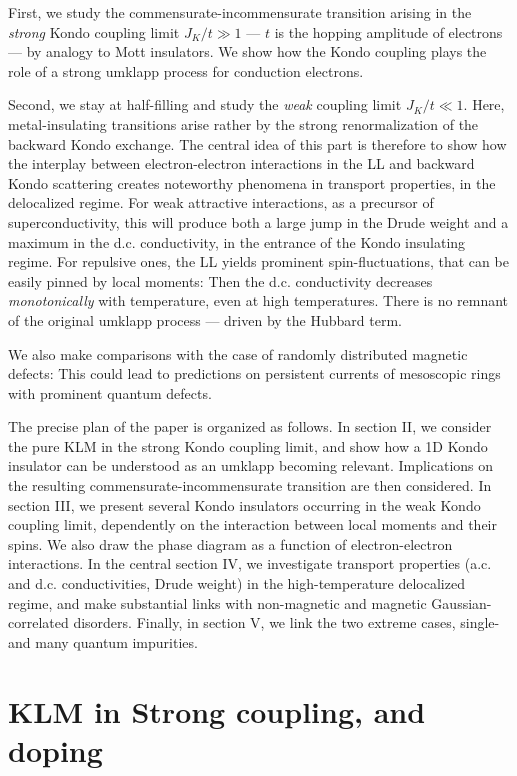 First, we study the commensurate-incommensurate 
transition arising in the {\it strong} Kondo coupling limit 
$J_K/t\gg 1$ --- $t$ is the hopping amplitude of electrons --- by 
analogy to Mott insulators. We show how the Kondo coupling plays the role of
a strong umklapp process for conduction electrons.

Second, we stay at half-filling and study the {\it weak} coupling limit
$J_K/t\ll 1$. 
Here,
metal-insulating transitions\cite{Giam1} arise rather
by the strong renormalization of the backward Kondo
exchange. The central idea of this part is therefore to show how
the interplay between electron-electron interactions in the LL 
and backward Kondo
scattering creates noteworthy phenomena in transport properties, in the
delocalized regime. 
For weak attractive interactions, as a precursor of 
superconductivity, 
this will produce both a large jump in the
Drude weight and a maximum in the d.c. conductivity, in the entrance of
the Kondo insulating regime. 
For repulsive ones, the LL yields prominent spin-fluctuations, that can
be easily pinned by local moments: Then the d.c. conductivity decreases
\emph{monotonically} with temperature, even at high temperatures. There is
no remnant of the original umklapp process --- driven by the
Hubbard term.

We also make comparisons
with the case of randomly distributed magnetic defects: This could
lead to predictions on persistent currents of mesoscopic rings with prominent
quantum defects.

The precise 
plan of the paper is organized as follows. In section II, we consider the
pure KLM in
the strong Kondo coupling limit, and show how a 1D Kondo insulator can be
understood as an umklapp becoming relevant. 
Implications on the resulting commensurate-incommensurate
transition are then considered. 
In section III, we present several Kondo insulators occurring in the
weak Kondo coupling limit, dependently on the interaction 
between local moments and their spins. We also draw the
phase diagram as a function of electron-electron
interactions. In the central section IV, we investigate transport properties
(a.c. and d.c. conductivities, Drude weight) in the high-temperature
delocalized regime, and make substantial links with non-magnetic 
and magnetic Gaussian-correlated disorders.
Finally, in section V, we link the two extreme cases, single- and many quantum
impurities.

\section{KLM in Strong coupling, and doping}

